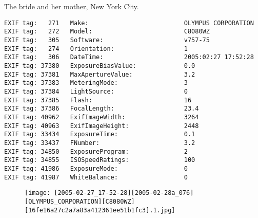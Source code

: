 \section{\protect{}}
\noindent The bride and her mother, New York City.
\noindent
\begin{lstlisting}
EXIF tag:   271   Make:                          OLYMPUS CORPORATION
EXIF tag:   272   Model:                         C8080WZ
EXIF tag:   305   Software:                      v757-75
EXIF tag:   274   Orientation:                   1
EXIF tag:   306   DateTime:                      2005:02:27 17:52:28
EXIF tag: 37380   ExposureBiasValue:             0.0
EXIF tag: 37381   MaxApertureValue:              3.2
EXIF tag: 37383   MeteringMode:                  3
EXIF tag: 37384   LightSource:                   0
EXIF tag: 37385   Flash:                         16
EXIF tag: 37386   FocalLength:                   23.4
EXIF tag: 40962   ExifImageWidth:                3264
EXIF tag: 40963   ExifImageHeight:               2448
EXIF tag: 33434   ExposureTime:                  0.1
EXIF tag: 33437   FNumber:                       3.2
EXIF tag: 34850   ExposureProgram:               2
EXIF tag: 34855   ISOSpeedRatings:               100
EXIF tag: 41986   ExposureMode:                  0
EXIF tag: 41987   WhiteBalance:                  0

\end{lstlisting}
\clearpage
\begin{figure}
\raggedleft
\texttt{[image: [2005-02-27\_17-52-28][2005-02-28a\_076][OLYMPUS\_CORPORATION][C8080WZ][16fe16a27c2a7a83a412361ee51b1fc3].1.jpg]}
\end{figure}


\clearpage
